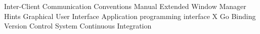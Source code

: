  {Inter-Client Communication Conventions Manual}
 {Extended Window Manager Hints}
 {Graphical User Interface}
 {Application programming interface}
 {X Go Binding}
 {Version Control System}
 {Continuous Integration}
